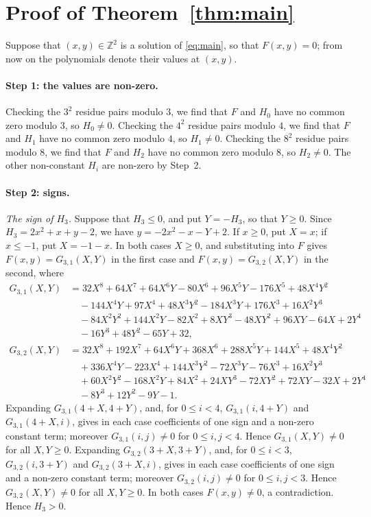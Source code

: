 \documentclass[11pt]{article}
\newcommand{\Z}{\mathbb{Z}}
\begin{document}
\section{Proof of Theorem~\ref{thm:main}}

Suppose that $(x,y)\in\Z^2$ is a solution of \eqref{eq:main}, so that $F(x,y)=0$; from now on the polynomials denote their values at $(x,y)$.
\paragraph{Step 1: the values are non-zero.} Checking the $3^2$ residue pairs modulo $3$, we find that $F$ and $H_{0}$ have no common zero modulo $3$, so $H_{0}\neq0$. Checking the $4^2$ residue pairs modulo $4$, we find that $F$ and $H_{1}$ have no common zero modulo $4$, so $H_{1}\neq0$. Checking the $8^2$ residue pairs modulo $8$, we find that $F$ and $H_{2}$ have no common zero modulo $8$, so $H_{2}\neq0$. The other non-constant $H_i$ are non-zero by Step~2.

\paragraph{Step 2: signs.} \emph{The sign of $H_{3}$.} Suppose that $H_{3}\leq0$, and put $Y=-H_{3}$, so that $Y\geq0$. Since $H_{3}=2x^{2}+x+y-2$, we have $y=-2x^{2}-x-Y+2$. If $x\geq0$, put $X=x$; if $x\leq-1$, put $X=-1-x$. In both cases $X\geq0$, and substituting into $F$ gives $F(x,y)=G_{3,1}(X,Y)$ in the first case and $F(x,y)=G_{3,2}(X,Y)$ in the second, where
\begin{align*}
G_{3,1}(X,Y)&=32X^{8}+64X^{7}+64X^{6}Y-80X^{6}+96X^{5}Y-176X^{5}+48X^{4}Y^{2}\\
&\quad-144X^{4}Y+97X^{4}+48X^{3}Y^{2}-184X^{3}Y+176X^{3}+16X^{2}Y^{3}\\
&\quad-84X^{2}Y^{2}+144X^{2}Y-82X^{2}+8XY^{3}-48XY^{2}+96XY-64X+2Y^{4}\\
&\quad-16Y^{3}+48Y^{2}-65Y+32,\\
G_{3,2}(X,Y)&=32X^{8}+192X^{7}+64X^{6}Y+368X^{6}+288X^{5}Y+144X^{5}+48X^{4}Y^{2}\\
&\quad+336X^{4}Y-223X^{4}+144X^{3}Y^{2}-72X^{3}Y-76X^{3}+16X^{2}Y^{3}\\
&\quad+60X^{2}Y^{2}-168X^{2}Y+84X^{2}+24XY^{3}-72XY^{2}+72XY-32X+2Y^{4}\\
&\quad-8Y^{3}+12Y^{2}-9Y-1.
\end{align*}
Expanding $G_{3,1}(4+X,4+Y)$, and, for $0\leq i<4$, $G_{3,1}(i,4+Y)$ and $G_{3,1}(4+X,i)$, gives in each case coefficients of one sign and a non-zero constant term; moreover $G_{3,1}(i,j)\neq0$ for $0\leq i,j<4$. Hence $G_{3,1}(X,Y)\neq0$ for all $X,Y\geq0$. Expanding $G_{3,2}(3+X,3+Y)$, and, for $0\leq i<3$, $G_{3,2}(i,3+Y)$ and $G_{3,2}(3+X,i)$, gives in each case coefficients of one sign and a non-zero constant term; moreover $G_{3,2}(i,j)\neq0$ for $0\leq i,j<3$. Hence $G_{3,2}(X,Y)\neq0$ for all $X,Y\geq0$. In both cases $F(x,y)\neq0$, a contradiction. Hence $H_{3}>0$.
\end{document}
